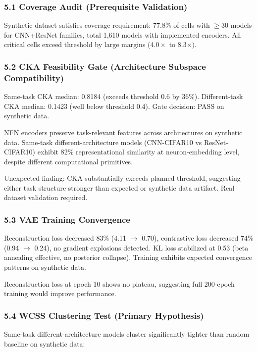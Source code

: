 
\subsubsection{5.1 Coverage Audit (Prerequisite Validation)}

Synthetic dataset satisfies coverage requirement: 77.8\% of cells with $\geq 30$ models for CNN+ResNet families, total 1,610 models with implemented encoders. All critical cells exceed threshold by large margins (4.$0\times$ to 8.$3\times )$.

\subsubsection{5.2 CKA Feasibility Gate (Architecture Subspace Compatibility)}

Same-task CKA median: 0.8184 (exceeds threshold 0.6 by 36\%). Different-task CKA median: 0.1423 (well below threshold 0.4). Gate decision: PASS on synthetic data.

NFN encoders preserve task-relevant features across architectures on synthetic data. Same-task different-architecture models (CNN-CIFAR10 vs ResNet-CIFAR10) exhibit 82\% representational similarity at neuron-embedding level, despite different computational primitives.

Unexpected finding: CKA substantially exceeds planned threshold, suggesting either task structure stronger than expected or synthetic data artifact. Real dataset validation required.

\subsubsection{5.3 VAE Training Convergence}

Reconstruction loss decreased 83\% (4.11 $\rightarrow$ 0.70), contrastive loss decreased 74\% (0.94 $\rightarrow$ 0.24), no gradient explosions detected. KL loss stabilized at 0.53 (beta annealing effective, no posterior collapse). Training exhibits expected convergence patterns on synthetic data.

Reconstruction loss at epoch 10 shows no plateau, suggesting full 200-epoch training would improve performance.

\subsubsection{5.4 WCSS Clustering Test (Primary Hypothesis)}

Same-task different-architecture models cluster significantly tighter than random baseline on synthetic data:

